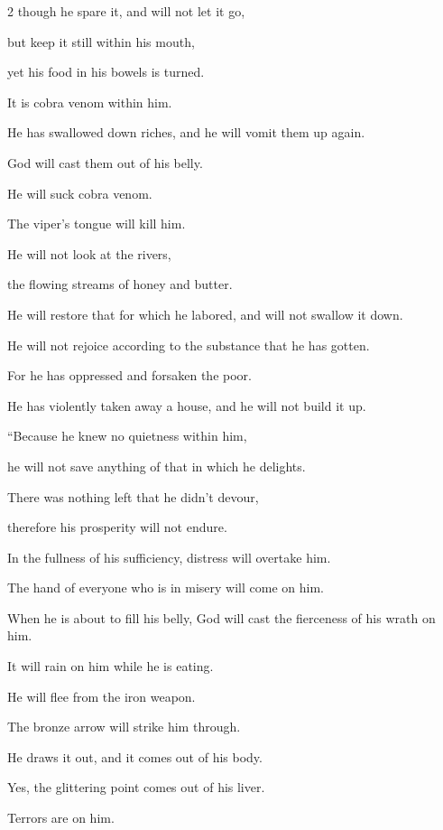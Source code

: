 \begin{multicols}{2}
	\myverse{}though he spare it, and will not let it go,
	
	but keep it still within his mouth,
	
	\myverse{}yet his food in his bowels is turned.
	
	It is cobra venom within him.
	
	\myverse{}He has swallowed down riches, and he will vomit them up again.
	
	God will cast them out of his belly.
	
	\myverse{}He will suck cobra venom.
	
	The viper’s tongue will kill him.
	
	\myverse{}He will not look at the rivers,
	
	the flowing streams of honey and butter.
	
	\myverse{}He will restore that for which he labored, and will not swallow
	it down.
	
	He will not rejoice according to the substance that he has gotten.
	
	\myverse{}For he has oppressed and forsaken the poor.
	
	He has violently taken away a house, and he will not build it up.
	
	\vspace{\baselineskip}
	
	\myverse{}“Because he knew no quietness within him,
	
	he will not save anything of that in which he delights.
	
	\myverse{}There was nothing left that he didn’t devour,
	
	therefore his prosperity will not endure.
	
	\myverse{}In the fullness of his sufficiency, distress will overtake
	him.
	
	The hand of everyone who is in misery will come on him.
	
	\myverse{}When he is about to fill his belly, God will cast the fierceness
	of his wrath on him.
	
	It will rain on him while he is eating.
	
	\myverse{}He will flee from the iron weapon.
	
	The bronze arrow will strike him through.
	
	\myverse{}He draws it out, and it comes out of his body.
	
	Yes, the glittering point comes out of his liver.
	
	Terrors are on him.
	

\end{multicols}
